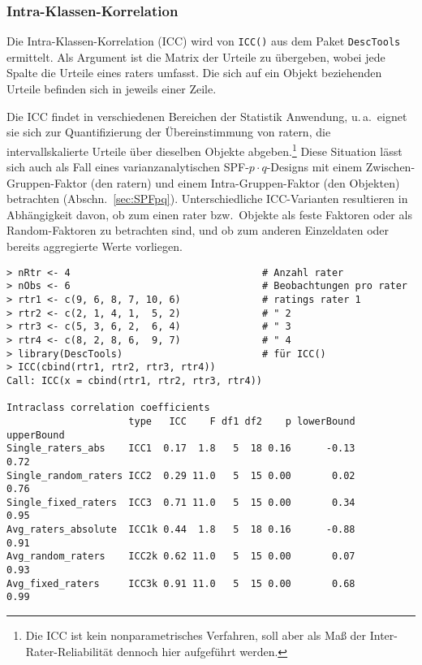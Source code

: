 \subsubsection{Intra-Klassen-Korrelation}

Die Intra-Klassen-Korrelation (ICC) wird von \lstinline!ICC()! aus dem Paket \lstinline!DescTools! ermittelt. Als Argument ist die Matrix der Urteile zu übergeben, wobei jede Spalte die Urteile eines raters umfasst. Die sich auf ein Objekt beziehenden Urteile befinden sich in jeweils einer Zeile.

Die ICC findet in verschiedenen Bereichen der Statistik Anwendung, u.\,a.\ eignet sie sich zur Quantifizierung der Übereinstimmung von ratern, die intervallskalierte Urteile über dieselben Objekte abgeben.\footnote{Die ICC ist kein nonparametrisches Verfahren, soll aber als Maß der Inter-Rater-Reliabilität dennoch hier aufgeführt werden.} Diese Situation lässt sich auch als Fall eines varianzanalytischen SPF-$p \cdot q$-Designs mit einem Zwischen-Gruppen-Faktor (den ratern) und einem Intra-Gruppen-Faktor (den Objekten) betrachten (Abschn.\ \ref{sec:SPFpq}). Unterschiedliche ICC-Varianten resultieren in Abhängigkeit davon, ob zum einen rater bzw.\ Objekte als feste Faktoren oder als Random-Faktoren zu betrachten sind, und ob zum anderen Einzeldaten oder bereits aggregierte Werte vorliegen.
\begin{lstlisting}
> nRtr <- 4                                 # Anzahl rater
> nObs <- 6                                 # Beobachtungen pro rater
> rtr1 <- c(9, 6, 8, 7, 10, 6)              # ratings rater 1
> rtr2 <- c(2, 1, 4, 1,  5, 2)              # " 2
> rtr3 <- c(5, 3, 6, 2,  6, 4)              # " 3
> rtr4 <- c(8, 2, 8, 6,  9, 7)              # " 4
> library(DescTools)                        # für ICC()
> ICC(cbind(rtr1, rtr2, rtr3, rtr4))
Call: ICC(x = cbind(rtr1, rtr2, rtr3, rtr4))

Intraclass correlation coefficients
                     type   ICC    F df1 df2    p lowerBound upperBound
Single_raters_abs    ICC1  0.17  1.8   5  18 0.16      -0.13       0.72
Single_random_raters ICC2  0.29 11.0   5  15 0.00       0.02       0.76
Single_fixed_raters  ICC3  0.71 11.0   5  15 0.00       0.34       0.95
Avg_raters_absolute  ICC1k 0.44  1.8   5  18 0.16      -0.88       0.91
Avg_random_raters    ICC2k 0.62 11.0   5  15 0.00       0.07       0.93
Avg_fixed_raters     ICC3k 0.91 11.0   5  15 0.00       0.68       0.99
\end{lstlisting}

